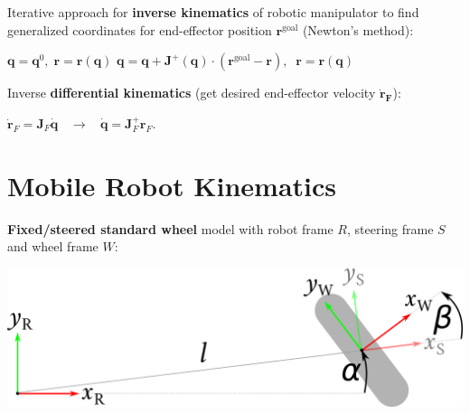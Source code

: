 \documentclass[landscape]{article}
\newcommand{\vmspace}{\vspace{-7pt}}
\newcommand{\vpspace}{\vspace{5pt}}
\newcommand{\vtspace}{\vspace{-10pt}}
\begin{document}
\begin{multicols}{3}
\vpspace

\begin{minipage}{\columnwidth}
  Iterative approach for \textbf{inverse kinematics} of robotic manipulator to
  find generalized coordinates for end-effector position $\mathbf r^\text{goal}$
  (Newton's method):\\
  \vmspace
  \begin{algorithm}[H]
    $\mathbf q = \mathbf q^0,\;\mathbf r = \mathbf r(\mathbf q)$\;
    {
    $\mathbf q = \mathbf q + \mathbf J^+(\mathbf q) \cdot (\mathbf r^\text{goal}
    - \mathbf r),\;\;
    \mathbf r = \mathbf r ( \mathbf q )$\;
    }
  \end{algorithm}
\end{minipage}

\vpspace

\begin{minipage}{\columnwidth}
  Inverse \textbf{differential kinematics} (get desired end-effector velocity
  $\mathbf{\dot{r}_F}$):
  \vmspace
  \begin{center}
    $\mathbf{\dot r}_F = \mathbf J_F \mathbf{\dot q}$
    $\;\;\rightarrow\;\;$
    $\mathbf{\dot q} = \mathbf J_F^+ \mathbf r_F.$
  \end{center}
\end{minipage}


\vtspace

\section{Mobile Robot Kinematics}

\vmspace

\begin{minipage}{\columnwidth}
\textbf{Fixed/steered standard wheel} model with robot frame $R$, steering frame
$S$ and wheel frame $W$:
\vmspace
\vmspace
\begin{center}
  \includegraphics[width=0.9\columnwidth]{img/3_Wheel.png}
\end{center}
\end{minipage}



\end{multicols}
\end{document}
